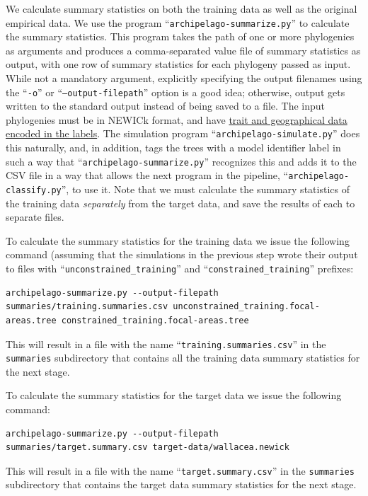\documentclass[11pt,openany]{memoir} %
\begin{document}
We calculate summary statistics on both the training data as well as the original empirical data.
We use the program ``\texttt{archipelago-summarize.py}'' to calculate the summary statistics.
This program takes the path of one or more phylogenies as arguments and produces a comma-separated value file of summary statistics as output, with one row of summary statistics for each phylogeny passed as input.
While not a mandatory argument, explicitly specifying the output filenames using the ``\texttt{-o}'' or ``\texttt{--output-filepath}'' option is a good idea; otherwise, output gets written to the standard output instead of being saved to a file.
The input phylogenies must be in NEWICk format, and have \hyperref[sec:workflow-encoding-the-target-data]{trait and geographical data encoded in the labels}.
The simulation program ``\texttt{archipelago-simulate.py}'' does this naturally, and, in addition, tags the trees with a model identifier label in such a way that ``\texttt{archipelago-summarize.py}'' recognizes this and adds it to the CSV file in a way that allows the next program in the pipeline, ``\texttt{archipelago-classify.py}'', to use it.
Note that we must calculate the summary statistics of the training data \textit{separately} from the target data, and save the results of each to separate files.

To calculate the summary statistics for the training data we issue the following command (assuming that the simulations in the previous step wrote their output to files with ``\texttt{unconstrained\_training}'' and ``\texttt{constrained\_training}'' prefixes:
\begin{lstlisting}
archipelago-summarize.py --output-filepath summaries/training.summaries.csv unconstrained_training.focal-areas.tree constrained_training.focal-areas.tree
\end{lstlisting}
This will result in a file with the name ``\texttt{training.summaries.csv}'' in the \texttt{summaries} subdirectory that contains all the training data summary statistics for the next stage.

To calculate the summary statistics for the target data we issue the following command:
\begin{lstlisting}
archipelago-summarize.py --output-filepath summaries/target.summary.csv target-data/wallacea.newick
\end{lstlisting}
This will result in a file with the name ``\texttt{target.summary.csv}'' in the \texttt{summaries} subdirectory that contains the target data summary statistics for the next stage.
\end{document}
